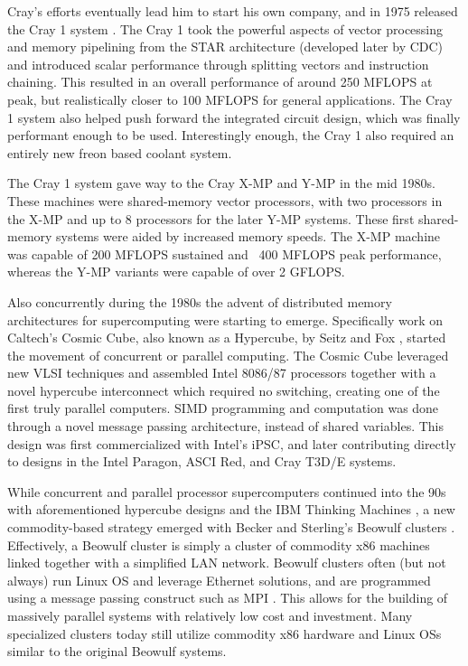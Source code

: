Cray's efforts eventually lead him to start his own company, and in 1975 released the Cray 1 system \cite{russell1978cray}. The Cray 1 took the powerful aspects of vector processing and memory pipelining from the STAR architecture (developed later by CDC) and introduced scalar performance through splitting vectors and instruction chaining. This resulted in an overall performance of around 250 MFLOPS at peak, but realistically closer to 100 MFLOPS for general applications.  The Cray 1 system also helped push forward the integrated circuit design, which was finally performant enough to be used. Interestingly enough, the Cray 1 also required an entirely new freon based coolant system.

The Cray 1 system gave way to the Cray X-MP and Y-MP in the mid 1980s. These machines were shared-memory vector processors, with two processors in the X-MP and up to 8 processors for the later Y-MP systems. These first shared-memory systems were aided by increased memory speeds. The X-MP machine was capable of 200 MFLOPS sustained and ~400 MFLOPS peak performance, whereas the Y-MP variants were capable of over 2 GFLOPS. 

Also concurrently during the 1980s the advent of distributed memory architectures for supercomputing were starting to emerge. Specifically work on Caltech's Cosmic Cube, also known as a Hypercube, by Seitz and Fox \cite{seitz1985cosmic, fox1987matrix}, started the movement of concurrent or parallel computing.  The Cosmic Cube leveraged new VLSI techniques and assembled Intel 8086/87 processors together with a novel hypercube interconnect which required no switching, creating one of the first truly parallel computers. SIMD programming and computation was done through a novel message passing architecture, instead of shared variables.  This design was first commercialized with Intel's iPSC, and later contributing directly to designs in the Intel Paragon, ASCI Red, and Cray T3D/E systems.  

While concurrent and parallel processor supercomputers continued into the 90s with aforementioned hypercube designs and the IBM Thinking Machines \cite{cm1}, a new commodity-based strategy emerged with Becker and Sterling's Beowulf clusters \cite{sterling2001beowulf}. Effectively, a Beowulf cluster is simply a cluster of commodity x86 machines linked together with a simplified LAN network. Beowulf clusters often (but not always) run Linux OS and leverage Ethernet solutions, and are programmed using a message passing construct such as MPI \cite{mpi}. This allows for the building of massively parallel systems with relatively low cost and investment. Many specialized clusters today still utilize commodity x86 hardware and Linux OSs similar to the original Beowulf systems.   

